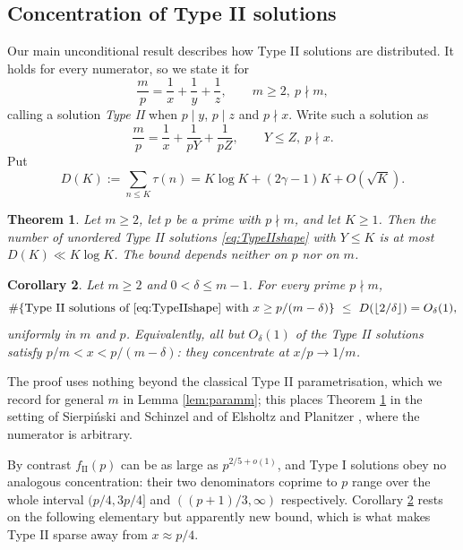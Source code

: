 \documentclass[11pt,reqno]{amsart}
\theoremstyle{plain}
\newtheorem{theorem}{Theorem}[section]
\newtheorem{corollary}[theorem]{Corollary}
\theoremstyle{definition}
\numberwithin{equation}{section}
\newcommand{\fII}{f_{\mathrm{II}}}
\begin{document}
\subsection{Concentration of Type II solutions}
Our main unconditional result describes how Type II solutions are distributed. It
holds for every numerator, so we state it for
\begin{equation}\label{eq:ESmintro}
  \frac mp=\frac1x+\frac1y+\frac1z,\qquad m\ge2,\ p\nmid m,
\end{equation}
calling a solution \emph{Type II} when $p\mid y$, $p\mid z$ and $p\nmid x$. Write
such a solution as
\begin{equation}\label{eq:TypeIIshape}
  \frac mp=\frac1x+\frac1{pY}+\frac1{pZ},\qquad Y\le Z,\ p\nmid x .
\end{equation}
Put
\begin{equation}\label{eq:Bfrak}
  D(K):=\sum_{n\le K}\tau(n)=K\log K+(2\gamma-1)K+O(\sqrt K).
\end{equation}

\begin{theorem}\label{thm:conc}
Let $m\ge2$, let $p$ be a prime with $p\nmid m$, and let $K\ge1$. Then the number of
unordered Type II solutions \eqref{eq:TypeIIshape}
with $Y\le K$ is at most $D(K)\ll K\log K$. The bound depends neither on $p$ nor on $m$.
\end{theorem}

\begin{corollary}\label{cor:conc}
Let $m\ge2$ and $0<\delta\le m-1$. For every prime $p\nmid m$,
\[
  \#\{\text{Type II solutions of \eqref{eq:TypeIIshape} with }x\ge p/(m-\delta)\}
  \ \le\ D(\lfloor2/\delta\rfloor)=O_{\delta}(1),
\]
uniformly in $m$ and $p$. Equivalently, all but $O_{\delta}(1)$ of the Type II solutions
satisfy $p/m<x<p/(m-\delta)$: they concentrate at $x/p\to1/m$.
\end{corollary}

The proof uses nothing beyond the classical Type II parametrisation, which we record
for general $m$ in Lemma \ref{lem:paramm}; this places Theorem \ref{thm:conc} in the
setting of Sierpi\'nski and Schinzel \cite{Schinzel} and of Elsholtz and Planitzer
\cite{ElsholtzPlanitzer}, where the numerator is arbitrary.

By contrast $\fII(p)$ can be as large as $p^{2/5+o(1)}$, and Type I solutions obey no
analogous concentration: their two denominators coprime to $p$ range over the whole
interval $(p/4,3p/4]$ and $((p+1)/3,\infty)$ respectively. Corollary \ref{cor:conc}
rests on the following elementary but apparently new bound, which is what makes
Type II sparse away from $x\approx p/4$.
\end{document}
